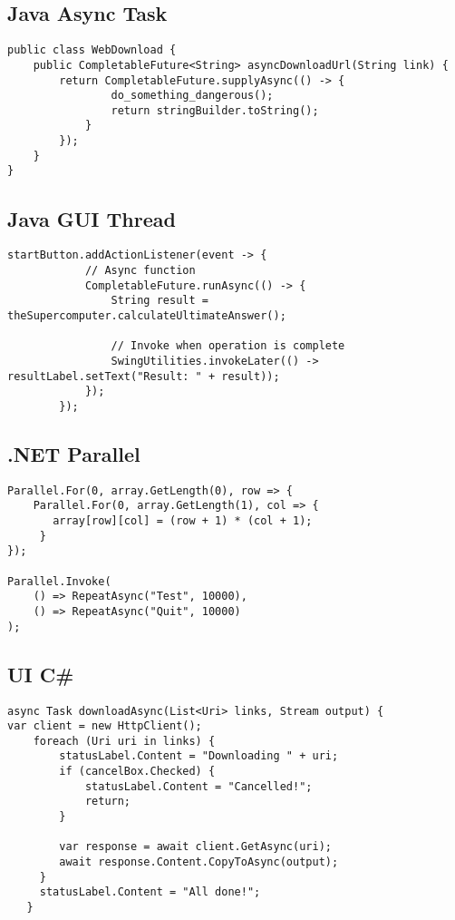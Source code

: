 \subsection{Java Async Task}

\begin{lstlisting}[style=csharp]
public class WebDownload {
	public CompletableFuture<String> asyncDownloadUrl(String link) {
		return CompletableFuture.supplyAsync(() -> {
				do_something_dangerous();
				return stringBuilder.toString();
			}
		});
	}
}

\end{lstlisting}

\subsection{Java GUI Thread}

\begin{lstlisting}[style=csharp]
		startButton.addActionListener(event -> {
			// Async function
			CompletableFuture.runAsync(() -> {
				String result = theSupercomputer.calculateUltimateAnswer();
				
				// Invoke when operation is complete
				SwingUtilities.invokeLater(() -> resultLabel.setText("Result: " + result));
			});
		});
\end{lstlisting}

\subsection{.NET Parallel}

\begin{lstlisting}[style=csharp]
Parallel.For(0, array.GetLength(0), row => { 
	Parallel.For(0, array.GetLength(1), col => {
       array[row][col] = (row + 1) * (col + 1);
     }
});

Parallel.Invoke(
    () => RepeatAsync("Test", 10000),
    () => RepeatAsync("Quit", 10000)
);
\end{lstlisting}

\subsection{UI C\#}
\begin{lstlisting}[style=csharp]
async Task downloadAsync(List<Uri> links, Stream output) { 
var client = new HttpClient();
	foreach (Uri uri in links) {
		statusLabel.Content = "Downloading " + uri; 
		if (cancelBox.Checked) {
        	statusLabel.Content = "Cancelled!";
			return; 
		}
		
       	var response = await client.GetAsync(uri);
       	await response.Content.CopyToAsync(output);
     }
     statusLabel.Content = "All done!";
   }
\end{lstlisting}

